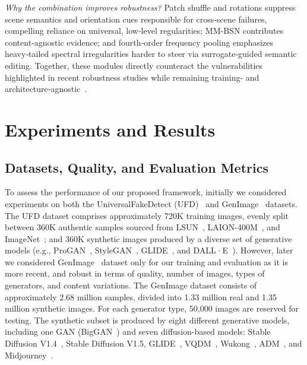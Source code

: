 \documentclass[letterpaper,twocolumn,10pt]{article}
\newcommand{\subhead}[1]{\vspace{1pt}\noindent{\textbf{#1.}}}
\begin{document}
\medskip\noindent\emph{Why the combination improves robustness?} Patch shuffle and rotations suppress scene semantics and orientation cues responsible for cross‑scene failures, compelling reliance on universal, low‑level regularities; MM‑BSN contributes content‑agnostic evidence; and fourth‑order frequency pooling emphasizes heavy‑tailed spectral irregularities harder to steer via surrogate‑guided semantic editing. Together, these modules directly counteract the vulnerabilities highlighted in recent robustness studies while remaining training‑ and architecture‑agnostic~\cite{Zheng2024semanticartifacts,Zhang2023mmbsn}.

\section{Experiments and Results}

\subsection{Datasets, Quality, and Evaluation Metrics}\label{sec:datasets}

\subhead{Datasets for training} 
To assess the performance of our proposed framework, initially we considered experiments on both the UniversalFakeDetect (UFD)~\cite{Ojha2023ufd} and GenImage~\cite{Zhu2024genimage} datasets. The UFD dataset comprises approximately 720K training images, evenly split between 360K authentic samples sourced from LSUN~\cite{yu2015lsun}, LAION-400M~\cite{schuhmann2021laion400m}, and ImageNet~\cite{deng2009imagenet}; and 360K synthetic images produced by a diverse set of generative models (e.g., ProGAN~\cite{karras2018progressive}, StyleGAN~\cite{karras2019stylegan}, 
GLIDE~\cite{nichol2022glide}, and DALL·E~\cite{ramesh2021zeroshot}).
However, later we considered GenImage~\cite{Zhu2024genimage} dataset only for our training and evaluation as it is more recent, and robust in terms of quality, number of images, types of generators, and content variations. The GenImage dataset consists of approximately 2.68 million samples, divided into 1.33 million real and 1.35 million synthetic images. For each generator type, 50,000 images are reserved for testing. The synthetic subset is produced by eight different generative models, including one GAN (BigGAN~\cite{brock2019biggan}) and seven diffusion-based models: Stable Diffusion V1.4~\cite{rombach2022ldm}, Stable Diffusion V1.5, GLIDE~\cite{nichol2022glide}, VQDM~\cite{gu2022vqdm}, Wukong~\cite{gu2022wukong}, ADM~\cite{dhariwal2021adm}, and Midjourney~\cite{midjourney2022}. 
\end{document}
